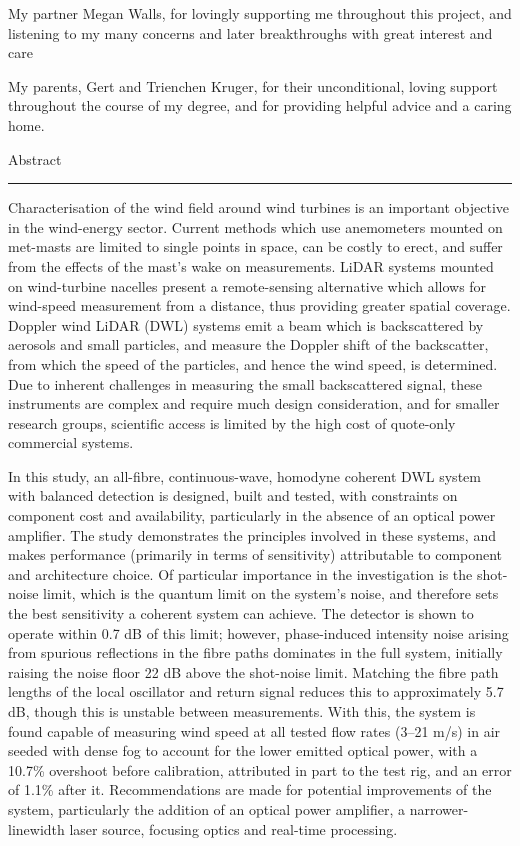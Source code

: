 \documentclass[a4paper,11pt]{report}
\begin{document}
My partner Megan Walls, for lovingly supporting me throughout this project, and listening to my many concerns and later breakthroughs with great interest and care

My parents, Gert and Trienchen Kruger, for their unconditional, loving support throughout the course of my degree, and for providing helpful advice and a caring home. 

\newpage

{\Large Abstract}\\
\hrule

Characterisation of the wind field around wind turbines is an important objective in the wind-energy sector. Current methods which use anemometers mounted on met-masts are limited to single points in space, can be costly to erect, and suffer from the effects of the mast’s wake on measurements. LiDAR systems mounted on wind-turbine nacelles present a remote-sensing alternative which allows for wind-speed measurement from a distance, thus providing greater spatial coverage. Doppler wind LiDAR (DWL) systems emit a beam which is backscattered by aerosols and small particles, and measure the Doppler shift of the backscatter, from which the speed of the particles, and hence the wind speed, is determined. Due to inherent challenges in measuring the small backscattered signal, these instruments are complex and require much design consideration, and for smaller research groups, scientific access is limited by the high cost of quote-only commercial systems.

In this study, an all-fibre, continuous-wave, homodyne coherent DWL system with balanced detection is designed, built and tested, with constraints on component cost and availability, particularly in the absence of an optical power amplifier. The study demonstrates the principles involved in these systems, and makes performance (primarily in terms of sensitivity) attributable to component and architecture choice. Of particular importance in the investigation is the shot-noise limit, which is the quantum limit on the system’s noise, and therefore sets the best sensitivity a coherent system can achieve. The detector is shown to operate within 0.7 dB of this limit; however, phase-induced intensity noise arising from spurious reflections in the fibre paths dominates in the full system, initially raising the noise floor 22 dB above the shot-noise limit. Matching the fibre path lengths of the local oscillator and return signal reduces this to approximately 5.7 dB, though this is unstable between measurements. With this, the system is found capable of measuring wind speed at all tested flow rates (3–21 m/s) in air seeded with dense fog to account for the lower emitted optical power, with a 10.7\% overshoot before calibration, attributed in part to the test rig, and an error of 1.1\% after it. Recommendations are made for potential improvements of the system, particularly the addition of an optical power amplifier, a narrower-linewidth laser source, focusing optics and real-time processing.
\end{document}

